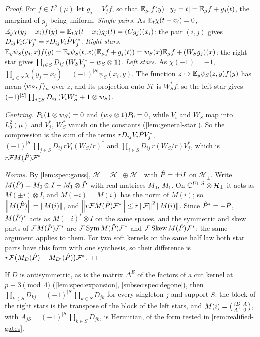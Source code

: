 \begin{proof}
For $f\in L^2(\mu)$ let $g_j=V_j^*f$, so that $\mathbb E_\mu[f(y)\mid y_j=t]=\mathbb E_\mu f+g_j(t)$, the
marginal of $y_j$ being uniform. \emph{Single pairs.} As $\mathbb E_t\chi(t-x_i)=0$,
$\mathbb E_y\chi(y_j-x_i)f(y)=\mathbb E_t\chi(t-x_i)g_j(t)=(Cg_j)(x_i)$: the pair $(i,j)$ gives
$D_{ij}V_iCV_j^*=rD_{ij}V_i\hat P V_j^*$. \emph{Right stars.}
$\mathbb E_y\psi_S(y_j,x)f(y)=\mathbb E_t\psi_S(t,x)(\mathbb E_\mu f+g_j(t))=w_S(x)\mathbb E_\mu f+(W_Sg_j)(x)$: the right
star gives $\prod_{i\in S}D_{ij}\,(W_SV_j^*+w_S\otimes\mathbf 1)$. \emph{Left stars.} As
$\chi(-1)=-1$, $\prod_{j\in S}\chi(y_j-x_i)=(-1)^{|S|}\psi_S(x_i,y)$. The function
$z\mapsto\mathbb E_y\psi_S(z,y)f(y)$ has mean $\left\langle w_S,f\right\rangle_\mu$ over $z$, and its projection onto
$\mathcal H$ is $W_S^*f$; so the left star gives
$(-1)^{|S|}\prod_{j\in S}D_{ij}\,(V_iW_S^*+\mathbf 1\otimes w_S)$.

\emph{Centring.} $P_0(\mathbf 1\otimes w_S)=0$ and $(w_S\otimes\mathbf 1)P_0=0$, while $V_i$ and $W_S$
map into $L^2_0(\mu)$ and $V_j^*$, $W_S^*$ vanish on the constants
(\cref{lem:general-star}). So the compression is the sum of the terms
$rD_{ij}V_i\hat P V_j^*$, $(-1)^{|S|}\prod_{j\in S}D_{ij}\,rV_i(W_S/r)^*$ and
$\prod_{i\in S}D_{ij}\,r(W_S/r)V_j^*$, which is $r\mathcal FM(\hat P)\mathcal F^*$.

\emph{Norms.} By \cref{lem:spec:gauss}, $\mathcal H=\mathcal H_+\oplus\mathcal H_-$ with
$\hat P=\pm iI$ on $\mathcal H_\pm$. Write $M(\hat P)=M_0\otimes I+M_1\otimes\hat P$ with real
matrices $M_0$, $M_1$. On $\mathbb C^{U\sqcup\mathcal S}\otimes\mathcal H_\pm$ it acts as $M(\pm i)\otimes I$,
and $M(-i)=\overline{M(i)}$ has the norm of $M(i)$; so $\left\|M(\hat P)\right\|=\left\|M(i)\right\|$, and
$\left\|r\mathcal FM(\hat P)\mathcal F^*\right\|\le r\left\|\mathcal F\right\|^2\left\|M(i)\right\|$. Since $\hat P^*=-\hat P$,
$M(\hat P)^*$ acts as $M(\pm i)^*\otimes I$ on the same spaces, and the symmetric and skew
parts of $\mathcal FM(\hat P)\mathcal F^*$ are $\mathcal F\operatorname{Sym}M(\hat P)\mathcal F^*$ and
$\mathcal F\operatorname{Skew}M(\hat P)\mathcal F^*$; the same argument applies to them. For two
soft kernels on the same half law both star parts have this form with one synthesis,
so their difference is $r\mathcal F\big(M_D(\hat P)-M_{D'}(\hat P)\big)\mathcal F^*$.
\end{proof}

If $D$ is antisymmetric, as is the matrix $\Delta^E$ of the factors of a cut kernel at
$p\equiv3\pmod4$ (\cref{lem:spec:expansion}, \cref{subsec:spec:degone}), then
$\prod_{k\in S}D_{kj}=(-1)^{|S|}\prod_{k\in S}D_{jk}$ for every singleton $j$ and
support $S$: the block of the right stars is the transpose of the block of the left
stars, and $M(i)=\begin{psmallmatrix}iD&A\\A^{\mathsf T}&0\end{psmallmatrix}$, with
$A_{jS}=(-1)^{|S|}\prod_{k\in S}D_{jk}$, is Hermitian, of the form tested in
\cref{rem:realified-gates}.

